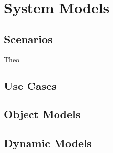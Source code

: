 \chapter{System Models}
\section{Scenarios}
Theo
\section{Use Cases}
\section{Object Models}
\section{Dynamic Models}